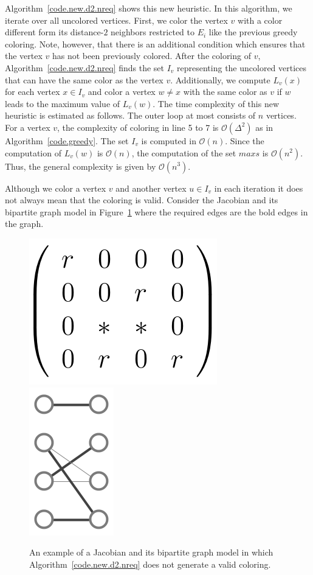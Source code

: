 \documentclass[12pt, twoside,a4paper,toc=bibliography]{scrbook}
\newcommand{\figref}[1]{Figure~\protect\ref{#1}}
\newcommand{\coderef}[1]{Algorithm~\protect\ref{#1}}
\newcommand{\nreq}{L}
\begin{document}
\coderef{code.new.d2.nreq} shows this new heuristic.
In this algorithm, we iterate over all uncolored vertices.
First, we color the vertex $v$ with a color different form
its distance-$2$ neighbors restricted to $E_i$ like the previous greedy coloring.
Note, however, that there is an additional condition which
ensures that the vertex $v$ has not been previously colored.
After the coloring of $v$, \coderef{code.new.d2.nreq} finds the set $I_v$
representing the uncolored vertices that can have the same color as the vertex $v$.
Additionally, we compute $\nreq_v(x)$ for each vertex $x\in I_v$
and color a vertex $w\neq x$ with the same color as $v$
if $w$ leads to the maximum value of $\nreq_v(w)$.
The time complexity of this new heuristic is estimated as follows.
The outer loop at most consists of $n$ vertices.
For a vertex $v$, the complexity of coloring in line 5 to 7 is $\mathcal{O}(\Delta^2)$ as
in \coderef{code.greedy}. The set $I_v$ is computed in $\mathcal{O}(n)$.
Since the computation of $\nreq_v(w)$ is $\mathcal{O}(n)$, the computation of
the set $maxs$ is $\mathcal{O}(n^2)$. Thus, the general complexity is given by $\mathcal{O}(n^3)$.

Although we color a vertex $v$ and another vertex $u\in I_v$ in each iteration
it does not always mean that the coloring is valid. Consider the Jacobian and
its bipartite graph model in \figref{twocolorings2} where the required edges are the bold edges in the graph.
\begin{figure}
\centering
\includegraphics[width=0.25\linewidth]{example_matrix}
\qquad
\includegraphics[width=0.12\linewidth]{example_bipartite}
\caption{An example of a Jacobian and its bipartite graph model
in which \coderef{code.new.d2.nreq} does not generate a valid coloring.}
\label{twocolorings2}
\end{figure}
\end{document}
